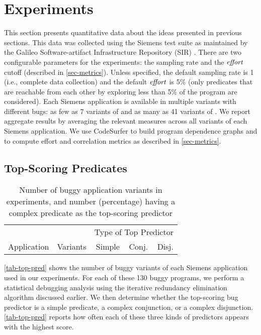 
\section{Experiments}
\label{sec-experiments}

This section presents quantitative data about the ideas presented in previous sections.  This data was collected using the Siemens test suite \cite{257766} as maintained by the Galileo Software-artifact Infrastructure Repository (SIR) \cite{Do05,SAI}.  There are two configurable parameters for the experiments: the sampling rate and the $\mathit{effort}$ cutoff (described in \autoref{sec-metrics}).  Unless specified, the default sampling rate is 1 (i.e., complete data collection) and the default $\mathit{effort}$ is 5\% (only predicates that are reachable from each other by exploring less than 5\% of the program are considered).  Each Siemens application is available in multiple variants with different bugs: as few as 7 variants of  and as many as 41 variants of .  We report aggregate results by averaging the relevant measures across all variants of each Siemens application.  We use CodeSurfer to build program dependence graphs and to compute effort and correlation metrics as described in \autoref{sec-metrics}.

\subsection{Top-Scoring Predicates}

\begin{table}[tb]
  \centering
  \newlength{\percentwidth}
  \settowidth{\percentwidth}{\%}
  \newcommand{\countcell}[1]{#1\hspace{\percentwidth}}
  \begin{tabular}{lrrrr}
    \toprule
    & & \multicolumn{3}{c}{Type of Top Predictor} \\
    \cmidrule{3-5}
    Application & Variants & Simple & Conj. & Disj. \\
    \midrule
    
    \bottomrule
  \end{tabular}
  \caption{Number of buggy application variants in experiments, and
    number (percentage) having a complex predicate as the top-scoring
    predictor}
  \label{tab-top-pred}
\end{table}

\autoref{tab-top-pred} shows the number of buggy variants of each Siemens application used in our experiments.  For each of these 130 buggy programs, we perform a statistical debugging analysis using the iterative redundancy elimination algorithm discussed earlier.  We then determine whether the top-scoring bug predictor is a simple predicate, a complex conjunction, or a complex disjunction.  \autoref{tab-top-pred} reports how often each of these three kinds of predictors appears with the highest score.

